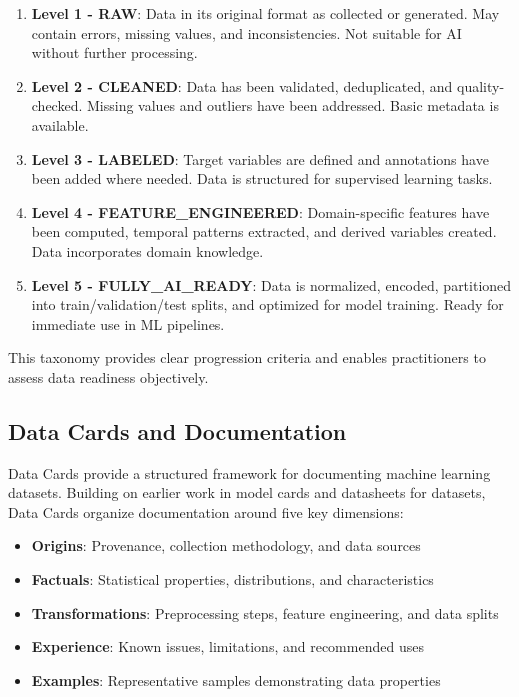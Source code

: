 \documentclass[11pt,letterpaper,twocolumn]{article}
\begin{document}
\begin{enumerate}
    \item \textbf{Level 1 - RAW}: Data in its original format as collected or generated. May contain errors, missing values, and inconsistencies. Not suitable for AI without further processing.

    \item \textbf{Level 2 - CLEANED}: Data has been validated, deduplicated, and quality-checked. Missing values and outliers have been addressed. Basic metadata is available.

    \item \textbf{Level 3 - LABELED}: Target variables are defined and annotations have been added where needed. Data is structured for supervised learning tasks.

    \item \textbf{Level 4 - FEATURE\_ENGINEERED}: Domain-specific features have been computed, temporal patterns extracted, and derived variables created. Data incorporates domain knowledge.

    \item \textbf{Level 5 - FULLY\_AI\_READY}: Data is normalized, encoded, partitioned into train/validation/test splits, and optimized for model training. Ready for immediate use in ML pipelines.
\end{enumerate}

This taxonomy provides clear progression criteria and enables practitioners to assess data readiness objectively.

\subsection{Data Cards and Documentation}

Data Cards \citep{datacards2022} provide a structured framework for documenting machine learning datasets. Building on earlier work in model cards and datasheets for datasets, Data Cards organize documentation around five key dimensions:

\begin{itemize}
    \item \textbf{Origins}: Provenance, collection methodology, and data sources
    \item \textbf{Factuals}: Statistical properties, distributions, and characteristics
    \item \textbf{Transformations}: Preprocessing steps, feature engineering, and data splits
    \item \textbf{Experience}: Known issues, limitations, and recommended uses
    \item \textbf{Examples}: Representative samples demonstrating data properties
\end{itemize}
\end{document}
